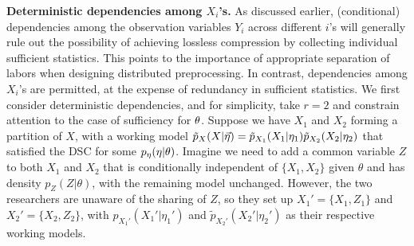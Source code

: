 \medskip
\noindent
{\bf Deterministic dependencies among $X_i$'s.}
As discussed earlier, (conditional) dependencies among the observation variables $Y_i$ across different $i$'s will generally rule out the possibility of achieving lossless compression by collecting individual sufficient statistics. This points to the importance of appropriate separation of labors when designing distributed preprocessing.
In contrast,  dependencies among $X_i$'s are  permitted, at the expense of redundancy in sufficient statistics.    
We first consider deterministic dependencies, and for simplicity, take $r = 2$ and constrain attention to the case of sufficiency for $\theta$.
 Suppose we have $X_1$ and $X_2$ forming a partition of   $X$, with a working model $\tilde{p}_X(X | \vec {\eta})=\tilde p_{X_1}(X_1 |\eta_1)\tilde p_{X_2}(X_2 |\eta_2) $ that satisfied the DSC for some $p_\eta(\eta | \theta)$.
 Imagine we need to add a common variable $Z$ to both $X_1$ and $X_2$ that is conditionally independent of $\{X_1, X_2\}$ given $\theta$ and has density $p_Z(Z|\theta)$, with the remaining model unchanged.
However, the two researchers are unaware of the sharing of $Z$, so they set up $X_1'=\{X_1, Z_1\}$ and $X_2'=\{X_2, Z_2\}$, with $p_{X_1'}(X_1' |\eta_1')$ and $\tilde p_{X_2'}(X_2' |\eta_2')$ as their respective working models.

